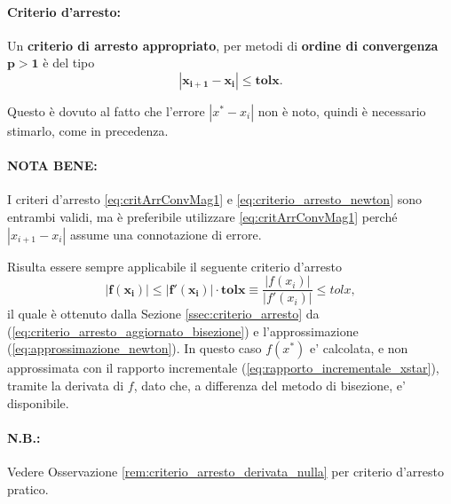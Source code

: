 \paragraph{Criterio d'arresto:} Un \textbf{criterio di arresto appropriato}, per metodi di \textbf{ordine di convergenza} $\boldsymbol{p>1}$ è del tipo
\begin{equation}\label{eq:critArrConvMag1}
	\boldsymbol{|x_{i+1}-x_i|\leq tolx}.
\end{equation}

\noindent Questo è dovuto al fatto che l'errore $|x^*-x_i|$ non è noto, quindi è necessario stimarlo, come in precedenza.

\paragraph{NOTA BENE:} I criteri d'arresto \ref{eq:critArrConvMag1} e \ref{eq:criterio_arresto_newton} sono entrambi validi, ma è preferibile utilizzare \ref{eq:critArrConvMag1} perché $|x_{i+1}-x_i|$ assume una connotazione di errore.

\begin{remark}\label{rem:criterio_arresto_newton}
	Risulta essere sempre applicabile il seguente criterio d'arresto
	\begin{equation}\label{eq:criterio_arresto_newton}
		\boldsymbol{|f(x_i)|\leq |f'(x_i)|\cdot tolx}\equiv \frac{|f(x_i)|}{|f'(x_i)|}\leq tolx,
	\end{equation}
	il quale è ottenuto dalla Sezione \ref{ssec:criterio_arresto} da (\ref{eq:criterio_arresto_aggiornato_bisezione}) e l'approssimazione (\ref{eq:approssimazione_newton}). In questo caso $f(x^*)$ e' calcolata, e non approssimata con il rapporto incrementale (\ref{eq:rapporto_incrementale_xstar}), tramite la derivata di $f$, dato che, a differenza del metodo di bisezione, e' disponibile.
\end{remark}

\paragraph{N.B.:} Vedere Osservazione \ref{rem:criterio_arresto_derivata_nulla} per criterio d'arresto pratico.

